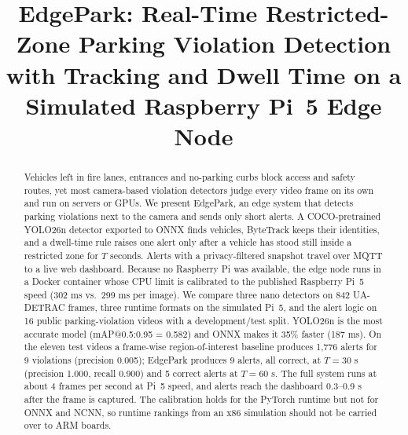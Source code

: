 \documentclass[conference]{IEEEtran}
\begin{document}
\title{EdgePark: Real-Time Restricted-Zone Parking Violation Detection with Tracking and Dwell Time on a Simulated Raspberry Pi~5 Edge Node}

\author{
\and
{}
\and
{}
}

\maketitle

\begin{abstract}
Vehicles left in fire lanes, entrances and no-parking curbs block access and safety routes, yet most camera-based violation detectors judge every video frame on its own and run on servers or GPUs. We present EdgePark, an edge system that detects parking violations next to the camera and sends only short alerts. A COCO-pretrained YOLO26n detector exported to ONNX finds vehicles, ByteTrack keeps their identities, and a dwell-time rule raises one alert only after a vehicle has stood still inside a restricted zone for $T$ seconds. Alerts with a privacy-filtered snapshot travel over MQTT to a live web dashboard. Because no Raspberry Pi was available, the edge node runs in a Docker container whose CPU limit is calibrated to the published Raspberry Pi~5 speed (302 ms vs.\ 299 ms per image). We compare three nano detectors on 842 UA-DETRAC frames, three runtime formats on the simulated Pi~5, and the alert logic on 16 public parking-violation videos with a development/test split. YOLO26n is the most accurate model (mAP@0.5:0.95 = 0.582) and ONNX makes it 35\% faster (187 ms). On the eleven test videos a frame-wise region-of-interest baseline produces 1,776 alerts for 9 violations (precision 0.005); EdgePark produces 9 alerts, all correct, at $T = 30$ s (precision 1.000, recall 0.900) and 5 correct alerts at $T = 60$ s. The full system runs at about 4 frames per second at Pi~5 speed, and alerts reach the dashboard 0.3--0.9 s after the frame is captured. The calibration holds for the PyTorch runtime but not for ONNX and NCNN, so runtime rankings from an x86 simulation should not be carried over to ARM boards.
\end{abstract}
\end{document}
